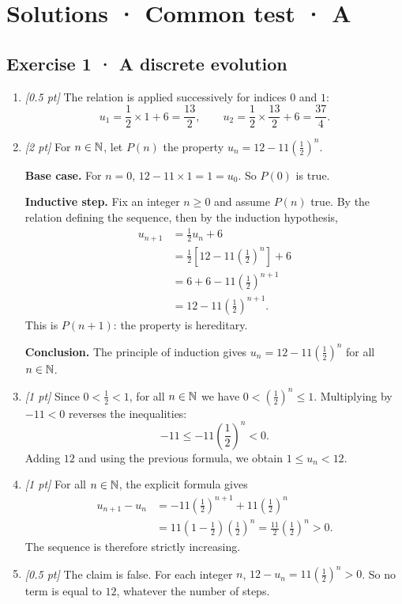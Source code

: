 \ifprof\clearpage

\section*{Solutions · Common test · A}\label{cor:3-3}

\subsection*{Exercise 1 · A discrete evolution}\begin{enumerate}

\item \textit{[0.5 pt]} The relation is applied successively for indices $0$ and $1$:\[u_1=\frac{1}{2}\times 1+6=\frac{13}{2},\qquad u_2=\frac{1}{2}\times \frac{13}{2}+6=\frac{37}{4}.\]

\item \textit{[2 pt]} For $n\in\mathbb N$, let $P(n)$ the property $u_n=12-11\left(\frac{1}{2}\right)^n$.
\par\smallskip\textbf{Base case.} For $n=0$, $12-11\times1=1=u_0$. So $P(0)$ is true.
\par\smallskip\textbf{Inductive step.} Fix an integer $n\ge0$ and assume $P(n)$ true. By the relation defining the sequence, then by the induction hypothesis,
\[\begin{aligned}u_{n+1}&=\frac{1}{2}u_n+6\\
&=\frac{1}{2}\left[12-11\left(\frac{1}{2}\right)^n\right]+6\\
&=6+6-11\left(\frac{1}{2}\right)^{n+1}\\
&=12-11\left(\frac{1}{2}\right)^{n+1}.
\end{aligned}\]
This is $P(n+1)$: the property is hereditary.
\par\smallskip\textbf{Conclusion.} The principle of induction gives $u_n=12-11\left(\frac{1}{2}\right)^n$ for all $n\in\mathbb N$.

\item \textit{[1 pt]} Since $0<\frac{1}{2}<1$, for all $n\in\mathbb N$ we have $0<(\frac{1}{2})^n\le1$. Multiplying by $-11<0$ reverses the inequalities:
\[-11\le-11(\frac{1}{2})^n<0.\]
Adding $12$ and using the previous formula, we obtain $1\le u_n<12$.

\item \textit{[1 pt]} For all $n\in\mathbb N$, the explicit formula gives
\[\begin{aligned}u_{n+1}-u_n&=-11(\frac{1}{2})^{n+1}+11(\frac{1}{2})^n\\&=11(1-\frac{1}{2})(\frac{1}{2})^n=\frac{11}{2}(\frac{1}{2})^n>0.\end{aligned}\]
The sequence is therefore strictly increasing.

\item \textit{[0.5 pt]} The claim is false. For each integer $n$, $12-u_n=11(\frac{1}{2})^n>0$. So no term is equal to $12$, whatever the number of steps.

\end{enumerate}


